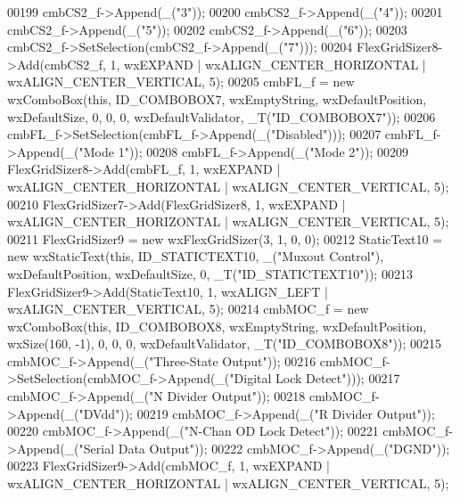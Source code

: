 \begin{DoxyCode}
00199     cmbCS2\_f->Append(\_(\textcolor{stringliteral}{"3"}));
00200     cmbCS2\_f->Append(\_(\textcolor{stringliteral}{"4"}));
00201     cmbCS2\_f->Append(\_(\textcolor{stringliteral}{"5"}));
00202     cmbCS2\_f->Append(\_(\textcolor{stringliteral}{"6"}));
00203     cmbCS2\_f->SetSelection(cmbCS2\_f->Append(\_(\textcolor{stringliteral}{"7"})));
00204     FlexGridSizer8->Add(cmbCS2\_f, 1, wxEXPAND | wxALIGN\_CENTER\_HORIZONTAL | wxALIGN\_CENTER\_VERTICAL, 5);
00205     cmbFL\_f = \textcolor{keyword}{new} wxComboBox(\textcolor{keyword}{this}, ID\_COMBOBOX7, wxEmptyString, wxDefaultPosition, wxDefaultSize, 0, 0, 0, 
      wxDefaultValidator, _T(\textcolor{stringliteral}{"ID\_COMBOBOX7"}));
00206     cmbFL\_f->SetSelection(cmbFL\_f->Append(\_(\textcolor{stringliteral}{"Disabled"})));
00207     cmbFL\_f->Append(\_(\textcolor{stringliteral}{"Mode 1"}));
00208     cmbFL\_f->Append(\_(\textcolor{stringliteral}{"Mode 2"}));
00209     FlexGridSizer8->Add(cmbFL\_f, 1, wxEXPAND | wxALIGN\_CENTER\_HORIZONTAL | wxALIGN\_CENTER\_VERTICAL, 5);
00210     FlexGridSizer7->Add(FlexGridSizer8, 1, wxEXPAND | wxALIGN\_CENTER\_HORIZONTAL | wxALIGN\_CENTER\_VERTICAL, 
      5);
00211     FlexGridSizer9 = \textcolor{keyword}{new} wxFlexGridSizer(3, 1, 0, 0);
00212     StaticText10 = \textcolor{keyword}{new} wxStaticText(\textcolor{keyword}{this}, ID\_STATICTEXT10, \_(\textcolor{stringliteral}{"Muxout Control"}), wxDefaultPosition, 
      wxDefaultSize, 0, _T(\textcolor{stringliteral}{"ID\_STATICTEXT10"}));
00213     FlexGridSizer9->Add(StaticText10, 1, wxALIGN\_LEFT | wxALIGN\_CENTER\_VERTICAL, 5);
00214     cmbMOC\_f = \textcolor{keyword}{new} wxComboBox(\textcolor{keyword}{this}, ID\_COMBOBOX8, wxEmptyString, wxDefaultPosition, wxSize(160, -1), 0, 0, 
      0, wxDefaultValidator, _T(\textcolor{stringliteral}{"ID\_COMBOBOX8"}));
00215     cmbMOC\_f->Append(\_(\textcolor{stringliteral}{"Three-State Output"}));
00216     cmbMOC\_f->SetSelection(cmbMOC\_f->Append(\_(\textcolor{stringliteral}{"Digital Lock Detect"})));
00217     cmbMOC\_f->Append(\_(\textcolor{stringliteral}{"N Divider Output"}));
00218     cmbMOC\_f->Append(\_(\textcolor{stringliteral}{"DVdd"}));
00219     cmbMOC\_f->Append(\_(\textcolor{stringliteral}{"R Divider Output"}));
00220     cmbMOC\_f->Append(\_(\textcolor{stringliteral}{"N-Chan OD Lock Detect"}));
00221     cmbMOC\_f->Append(\_(\textcolor{stringliteral}{"Serial Data Output"}));
00222     cmbMOC\_f->Append(\_(\textcolor{stringliteral}{"DGND"}));
00223     FlexGridSizer9->Add(cmbMOC\_f, 1, wxEXPAND | wxALIGN\_CENTER\_HORIZONTAL | wxALIGN\_CENTER\_VERTICAL, 5);

\end{DoxyCode}
